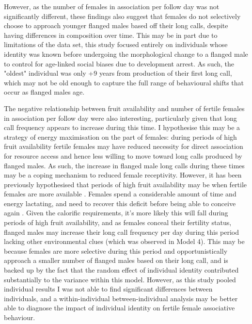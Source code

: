However, as the number of females in association per follow day was not significantly different, these findings also suggest that females do not selectively choose to approach younger flanged males based off their long calls, despite having differences in composition over time. This may be in part due to limitations of the data set, this study focused entirely on individuals whose identity was known before undergoing the morphological change to a flanged male to control for age-linked social biases due to development arrest. As such, the "oldest" individual was only +9 years from production of their first long call, which may not be old enough to capture the full range of behavioural shifts that occur as flanged males age. 

The negative relationship between fruit availability and number of fertile females in association per follow day were also interesting, particularly given that long call frequency appears to increase during this time. I hypothesise this may be a strategy of energy maximisation on the part of females: during periods of high fruit availability fertile females may have reduced necessity for direct association for resource access and hence less willing to move toward long calls produced by flanged males. As such, the increase in flanged male long calls during these times may be a coping mechanism to reduced female receptivity. However, it has been previously hypothesised that periods of high fruit availability may be when fertile females are more available \citep{Spillmann.2016}. Females spend a considerable amount of time and energy lactating, and need to recover this deficit before being able to conceive again \citep{Knott.2008dtq}. Given the calorific requirements, it's more likely this will fall during periods of high fruit availability,  and as females conceal their fertility status, flanged males may increase their long call frequency per day during this period lacking other environmental clues (which was observed in Model 4). This may be because females are more selective during this period and opportunistically approach a smaller number of flanged males based on their long call, and is backed up by the fact that the random effect of individual identity contributed substantially to the variance within this model. However, as this study pooled individual results I was not able to find significant differences between individuals, and a within-individual between-individual analysis may be better able to diagnose the impact of individual identity on fertile female associative behaviour.

